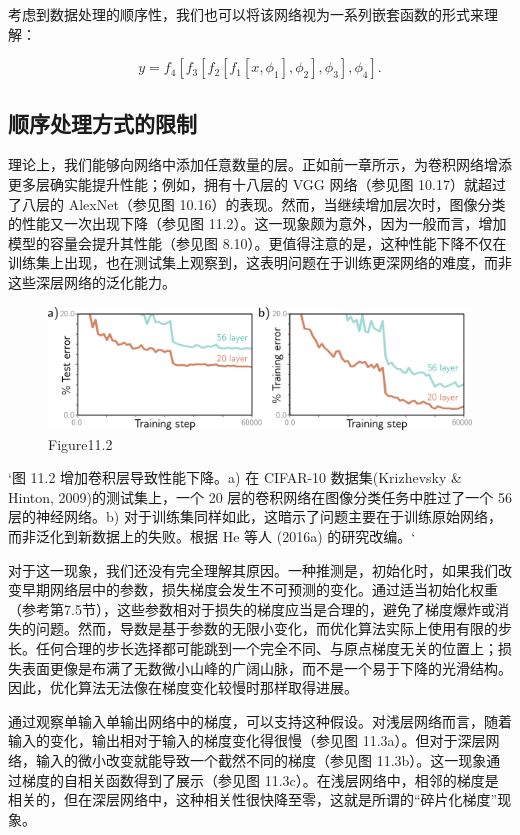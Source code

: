 考虑到数据处理的顺序性，我们也可以将该网络视为一系列嵌套函数的形式来理解：

\[
y = f_4 \left[ f_3 \left[ f_2 \left[ f_1[x, \phi_1], \phi_2 \right], \phi_3 \right], \phi_4 \right]. \tag{11.2}
\]
\subsection{顺序处理方式的限制}
理论上，我们能够向网络中添加任意数量的层。正如前一章所示，为卷积网络增添更多层确实能提升性能；例如，拥有十八层的 VGG 网络（参见图 10.17）就超过了八层的 AlexNet（参见图 10.16）的表现。然而，当继续增加层次时，图像分类的性能又一次出现下降（参见图 11.2）。这一现象颇为意外，因为一般而言，增加模型的容量会提升其性能（参见图 8.10）。更值得注意的是，这种性能下降不仅在训练集上出现，也在测试集上观察到，这表明问题在于训练更深网络的难度，而非这些深层网络的泛化能力。

\begin{figure}[h!]
\centering
\includegraphics[width=0.7\linewidth]{png/chapter11/ResidualMotivation.png}
\caption{Figure11.2}
\end{figure}

`图 11.2 增加卷积层导致性能下降。a) 在 CIFAR-10 数据集(Krizhevsky & Hinton, 2009)的测试集上，一个 20 层的卷积网络在图像分类任务中胜过了一个 56 层的神经网络。b) 对于训练集同样如此，这暗示了问题主要在于训练原始网络，而非泛化到新数据上的失败。根据 He 等人 (2016a) 的研究改编。`

对于这一现象，我们还没有完全理解其原因。一种推测是，初始化时，如果我们改变早期网络层中的参数，损失梯度会发生不可预测的变化。通过适当初始化权重（参考第7.5节），这些参数相对于损失的梯度应当是合理的，避免了梯度爆炸或消失的问题。然而，导数是基于参数的无限小变化，而优化算法实际上使用有限的步长。任何合理的步长选择都可能跳到一个完全不同、与原点梯度无关的位置上；损失表面更像是布满了无数微小山峰的广阔山脉，而不是一个易于下降的光滑结构。因此，优化算法无法像在梯度变化较慢时那样取得进展。

通过观察单输入单输出网络中的梯度，可以支持这种假设。对浅层网络而言，随着输入的变化，输出相对于输入的梯度变化得很慢（参见图 11.3a）。但对于深层网络，输入的微小改变就能导致一个截然不同的梯度（参见图 11.3b）。这一现象通过梯度的自相关函数得到了展示（参见图 11.3c）。在浅层网络中，相邻的梯度是相关的，但在深层网络中，这种相关性很快降至零，这就是所谓的“碎片化梯度”现象。

